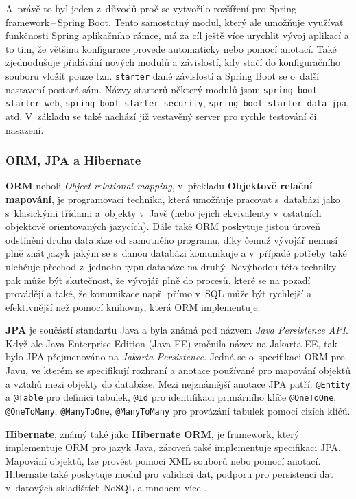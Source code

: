 A~právě to byl jeden z~důvodů proč se vytvořilo rozšíření pro Spring framework\,--\,Spring Boot. Tento samostatný modul, který ale umožňuje využívat funkčnosti Spring aplikačního rámce, má za cíl ještě více urychlit vývoj aplikací a to tím, že většinu konfigurace provede automaticky nebo pomocí anotací. Také zjednodušuje přidávání nových modulů a závislostí, kdy stačí do konfiguračního souboru vložit pouze tzn. \texttt{starter} dané závislosti a Spring Boot se o~další nastavení postará sám. Názvy starterů některý modulů jsou: \texttt{spring-boot-starter-web}, \texttt{spring-boot-starter-security}, \texttt{spring-boot-starter-da\-ta-jpa}, atd. V~základu se také nachází již vestavěný server pro rychle testování či nasazení.


\subsubsection* {ORM, JPA a Hibernate}

\textbf{ORM} neboli \textit{Object-relational mapping}, v~překladu \textbf{Objektově relační mapování}, je programovací technika, která umožňuje pracovat s~databázi jako s~klasickými třídami a~objekty v~Javě (nebo jejich ekvivalenty v~ostatních objektově orientovaných jazycích). Dále také ORM poskytuje jistou úroveň odstínění druhu databáze od samotného programu, díky čemuž vývojář nemusí plně znát jazyk jakým se s~danou databázi komunikuje a v~případě potřeby také ulehčuje přechod z~jednoho typu databáze na druhý. Nevýhodou této techniky pak může být skutečnost, že vývojář plně  do procesů, které se na pozadí provádějí a také, že komunikace např. přímo v~SQL může být rychlejší a efektivnější než pomocí knihovny, která ORM implementuje.

\textbf{JPA} je součástí standartu Java a byla známá pod názvem \textit{Java Persistence API}. Když ale Java Enterprise Edition (Java EE) změnila název na Jakarta EE, tak bylo JPA přejmenováno na \textit{Jakarta Persistence}. Jedná se o~specifikaci ORM pro Javu, ve kterém se specifikují rozhraní a anotace používané pro mapování objektů a vztahů mezi objekty do databáze. Mezi nejznámější anotace JPA patří: \texttt{@Entity} a \texttt{@Table} pro definici tabulek, \texttt{@Id} pro identifikaci primárního klíče \texttt{@OneToOne}, \texttt{@OneToMany}, \texttt{@ManyToOne}, \texttt{@ManyToMany} pro provázání tabulek pomocí cizích klíčů.

\textbf{Hibernate}, známý také jako \textbf{Hibernate ORM}, je framework, který implementuje ORM pro jazyk Java, zároveň také implementuje specifikaci JPA. Mapování objektů, lze provést pomocí XML souborů nebo pomocí anotací. Hibernate také poskytuje modul pro validaci dat, podporu pro persistenci dat v~datových skladištích NoSQL a mnohem více  \cite{Hibernate}.

